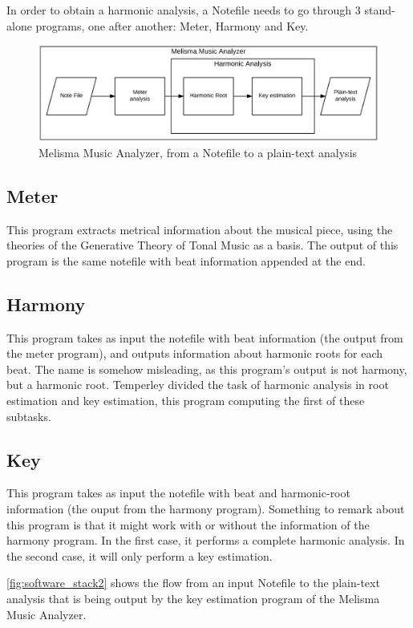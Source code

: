   In order to obtain a harmonic analysis, a Notefile needs to go through 3 stand-alone programs, one after another: Meter, Harmony and Key.

  \begin{figure}[ht]
    \centering
      \includegraphics[width=1.0\textwidth]{04-methodology/figures/2}
    \caption{Melisma Music Analyzer, from a Notefile to a plain-text analysis}
    \label{fig:software_stack2}
  \end{figure}

  \subsection{Meter}
    This program extracts metrical information about the musical piece, using the theories of the Generative Theory of Tonal Music as a basis.
    The output of this program is the same notefile with beat information appended at the end.
  \subsection{Harmony}
    This program takes as input the notefile with beat information (the output from the meter program), and outputs information about harmonic roots for each beat. The name is somehow misleading, as this program's output is not harmony, but a harmonic root. Temperley divided the task of harmonic analysis in root estimation and key estimation, this program computing the first of these subtasks.
  \subsection{Key}
    This program takes as input the notefile with beat and harmonic-root information (the ouput from the harmony program). Something to remark about this program is that it might work with or without the information of the harmony program. In the first case, it performs a complete harmonic analysis. In the second case, it will only perform a key estimation.

    \autoref{fig:software_stack2} shows the flow from an input Notefile to the plain-text analysis that is being output by the key estimation program of the Melisma Music Analyzer.

